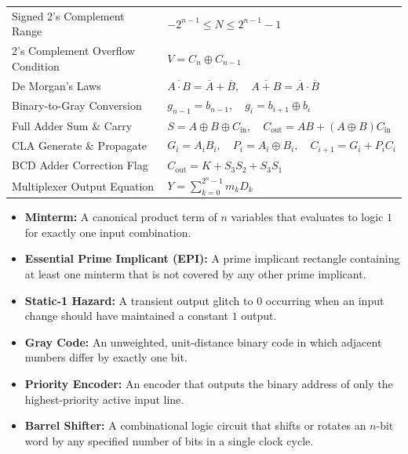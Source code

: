 \documentclass[12pt,a4paper]{article}
\renewcommand{\arraystretch}{1.45}
\begin{document}
\begin{tcolorbox}[formulabox, title={\textbf{Key Formulas and Identities at a Glance}}]
\renewcommand{\arraystretch}{1.35}
\begin{tabularx}{\linewidth}{B{5.2cm} X}
Signed 2's Complement Range & $-2^{n-1} \le N \le 2^{n-1}-1$ \\[4pt]
2's Complement Overflow Condition & $V = C_n \oplus C_{n-1}$ \\[4pt]
De Morgan's Laws & $\overline{A \cdot B} = \overline{A} + \overline{B}, \quad \overline{A + B} = \overline{A} \cdot \overline{B}$ \\[4pt]
Binary-to-Gray Conversion & $g_{n-1} = b_{n-1}, \quad g_i = b_{i+1} \oplus b_i$ \\[4pt]
Full Adder Sum \& Carry & $S = A \oplus B \oplus C_{\text{in}}, \quad C_{\text{out}} = AB + (A \oplus B)C_{\text{in}}$ \\[4pt]
CLA Generate \& Propagate & $G_i = A_i B_i, \quad P_i = A_i \oplus B_i, \quad C_{i+1} = G_i + P_i C_i$ \\[4pt]
BCD Adder Correction Flag & $C_{\text{out}} = K + S_3 S_2 + S_3 S_1$ \\[4pt]
Multiplexer Output Equation & $Y = \sum_{k=0}^{2^n-1} m_k D_k$ \\[4pt]
\end{tabularx}
\end{tcolorbox}

\begin{tcolorbox}[defbox, title={\textbf{One-Line Definitions}}]
\begin{itemize}[leftmargin=*, itemsep=2pt, topsep=0pt]
  \item \textbf{Minterm:} A canonical product term of $n$ variables that evaluates to logic $1$ for exactly one input combination.
  \item \textbf{Essential Prime Implicant (EPI):} A prime implicant rectangle containing at least one minterm that is not covered by any other prime implicant.
  \item \textbf{Static-1 Hazard:} A transient output glitch to $0$ occurring when an input change should have maintained a constant $1$ output.
  \item \textbf{Gray Code:} An unweighted, unit-distance binary code in which adjacent numbers differ by exactly one bit.
  \item \textbf{Priority Encoder:} An encoder that outputs the binary address of only the highest-priority active input line.
  \item \textbf{Barrel Shifter:} A combinational logic circuit that shifts or rotates an $n$-bit word by any specified number of bits in a single clock cycle.
\end{itemize}
\end{tcolorbox}
\end{document}
